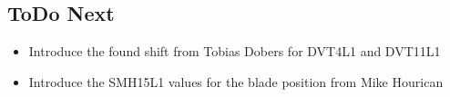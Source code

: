 \documentclass[11pt,letter,english]{article}
\begin{document}
\subsection*{ToDo Next}

\begin{itemize}
\item{Introduce the found shift from Tobias Dobers for DVT4L1 and DVT11L1}
\item{Introduce the SMH15L1 values for the blade position from Mike Hourican}
\end{itemize}



%
%
%
%
%
%
%
\end{document}
